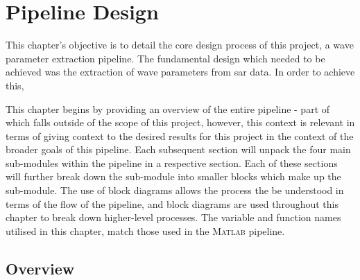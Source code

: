 \chapter{Pipeline Design}
\label{chap:systemDesign}

This chapter's objective is to detail the core design process of this project, a wave parameter extraction pipeline. The fundamental design which needed to be achieved was the extraction of wave parameters from \acs{sar} data. In order to achieve this, 




This chapter begins by providing an overview of the entire pipeline - part of which falls outside of the scope of this project, however, this context is relevant in terms of giving context to the desired results for this project in the context of the broader goals of this pipeline. Each subsequent section will unpack the four main sub-modules within the pipeline in a respective section. Each of these sections will further break down the sub-module into smaller blocks which make up the sub-module. The use of block diagrams allows the process the be understood in terms of the flow of the pipeline, and block diagrams are used throughout this chapter to break down higher-level processes. The variable and function names utilised in this chapter, match those used in the \textsc{Matlab} pipeline.

\section{Overview} \label{sec:systemDesign.overview}

